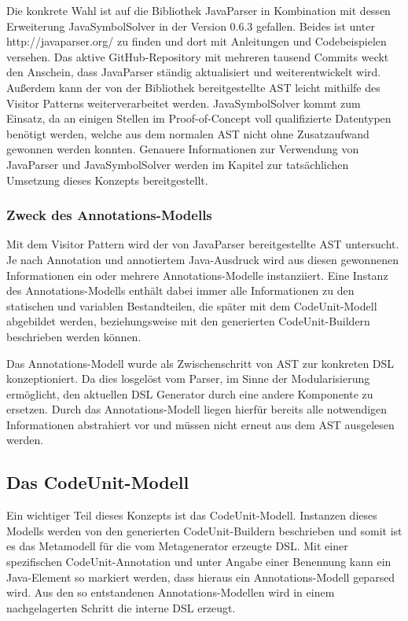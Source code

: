 \documentclass[12pt,oneside,a4paper,parskip]{scrbook}
\begin{document}
Die konkrete Wahl ist auf die Bibliothek JavaParser in Kombination mit dessen Erweiterung JavaSymbolSolver in der Version 0.6.3 gefallen. Beides ist unter http://javaparser.org/ zu finden und dort mit Anleitungen und Codebeispielen versehen. Das aktive GitHub-Repository mit mehreren tausend Commits weckt den Anschein, dass JavaParser ständig aktualisiert und weiterentwickelt wird. Außerdem kann der von der Bibliothek bereitgestellte AST leicht mithilfe des Visitor Patterns weiterverarbeitet werden. JavaSymbolSolver kommt zum Einsatz, da an einigen Stellen im Proof-of-Concept voll qualifizierte Datentypen benötigt werden, welche aus dem normalen AST nicht ohne Zusatzaufwand gewonnen werden konnten. Genauere Informationen zur Verwendung von JavaParser und JavaSymbolSolver werden im Kapitel zur tatsächlichen Umsetzung dieses Konzepts bereitgestellt.

\subsubsection{Zweck des Annotations-Modells}

Mit dem Visitor Pattern wird der von JavaParser bereitgestellte AST untersucht. Je nach Annotation und annotiertem Java-Ausdruck wird aus diesen gewonnenen Informationen ein oder mehrere Annotations-Modelle instanziiert. Eine Instanz des Annotations-Modells enthält dabei immer alle Informationen zu den statischen und variablen Bestandteilen, die später mit dem CodeUnit-Modell abgebildet werden, beziehungsweise mit den generierten CodeUnit-Buildern beschrieben werden können.

Das Annotations-Modell wurde als Zwischenschritt von AST zur konkreten DSL konzeptioniert. Da dies losgelöst vom Parser, im Sinne der Modularisierung ermöglicht, den aktuellen DSL Generator durch eine andere Komponente zu ersetzen. Durch das Annotations-Modell liegen hierfür bereits alle notwendigen Informationen abstrahiert vor und müssen nicht erneut aus dem AST ausgelesen werden.

\subsection{Das CodeUnit-Modell}

Ein wichtiger Teil dieses Konzepts ist das CodeUnit-Modell. Instanzen dieses Modells werden von den generierten CodeUnit-Buildern beschrieben und somit ist es das Metamodell für die vom Metagenerator erzeugte DSL. Mit einer spezifischen CodeUnit-Annotation und unter Angabe einer Benennung kann ein Java-Element so markiert werden, dass hieraus ein Annotations-Modell geparsed wird. Aus den so entstandenen Annotations-Modellen wird in einem nachgelagerten Schritt die interne DSL erzeugt.
\end{document}
